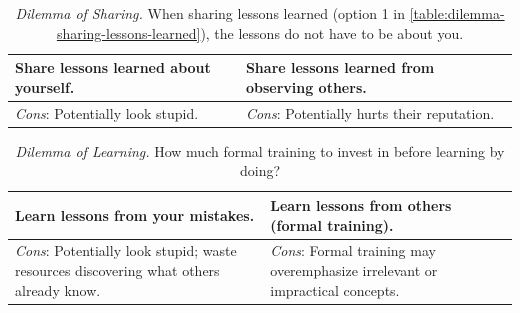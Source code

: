 \begin{center}
\begin{table}[H] %
\begin{tabular}{ | m{\dilemmatablewidth}| m{\dilemmatablewidth} | } 
  \hline
  \textbf{Share lessons learned about yourself.} & 
  \textbf{Share lessons learned from observing others.} \\ 
  \hline
  \textit{Cons}: Potentially look stupid. & 
  \textit{Cons}: Potentially hurts their reputation. \\  
  \hline
\end{tabular}
\caption{
\textit{Dilemma of Sharing.}
When sharing lessons learned (option 1 in \ref{table:dilemma-sharing-lessons-learned}), the lessons do not have to be about you. 
}
\label{table:dilemma-share-lessons-learned}
\end{table}
\end{center}



\begin{center}
\begin{table}[H] %
\begin{tabular}{ | m{\dilemmatablewidth}| m{\dilemmatablewidth} | } 
  \hline
  \textbf{Learn lessons from your mistakes.} & 
  \textbf{Learn lessons from others (formal training).} \\ 
  \hline
  \textit{Cons}: Potentially look stupid; waste resources discovering what others already know. & 
  \textit{Cons}: Formal training may overemphasize irrelevant or impractical concepts. \\  
  \hline
\end{tabular}
\caption{
\textit{Dilemma of Learning.}
How much formal training to invest in before learning by doing?
}
\label{table:dilemma-lessons-learned-source}
\end{table}
\end{center}

